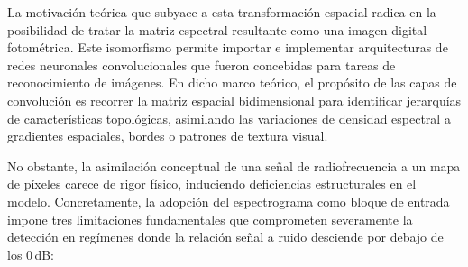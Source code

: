 La motivación teórica que subyace a esta transformación espacial radica en la posibilidad de tratar la matriz espectral resultante como una imagen digital fotométrica. Este isomorfismo permite importar e implementar arquitecturas de redes neuronales convolucionales que fueron concebidas para tareas de reconocimiento de imágenes. En dicho marco teórico, el propósito de las capas de convolución es recorrer la matriz espacial bidimensional para identificar jerarquías de características topológicas, asimilando las variaciones de densidad espectral a gradientes espaciales, bordes o patrones de textura visual. 

No obstante, la asimilación conceptual de una señal de radiofrecuencia a un mapa de píxeles carece de rigor físico, induciendo deficiencias estructurales en el modelo. Concretamente, la adopción del espectrograma como bloque de entrada impone tres limitaciones fundamentales que comprometen severamente la detección en regímenes donde la relación señal a ruido desciende por debajo de los 0\,dB:

